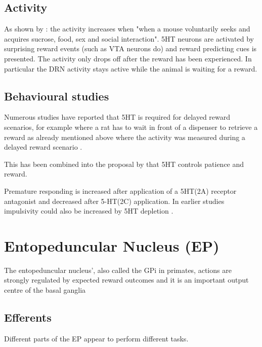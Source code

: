 \documentclass[12pt,a4paper]{article}
\let\oldsection\section
\renewcommand\section{\clearpage\oldsection}
\begin{document}
\subsection{Activity}

As shown by \citep{Li2016}: the activity increases when "when a mouse voluntarily seeks and acquires sucrose, food, sex and social interaction". 5HT neurons are activated by surprising reward events (such as VTA neurons do) and reward predicting cues is presented. The activity only drops off after the reward has been experienced. In particular the DRN activity stays active while the animal is waiting for a reward.

\subsection{Behavioural studies}

Numerous studies have reported that 5HT is required for delayed reward scenarios, for example where a rat has to wait in front of a dispenser to retrieve a reward \citep{Khani2016} as already mentioned above where the activity was measured during a delayed reward scenario \citep{Li2016}.

This has been combined into the proposal by \citep{Miyazaki2012} that 5HT controls patience and reward.

Premature responding is increased after \citep{Fletcher2007} application of a 5HT(2A) receptor antagonist and decreased after 5-HT(2C) application. In earlier studies impulsivity could also be increased by 5HT depletion \citep{Harrison1997}.







\section{Entopeduncular Nucleus (EP)}

The entopeduncular nucleus’, also called the GPi in primates, actions are
strongly regulated by expected reward outcomes and it is an important output centre of the basal ganglia \citep{Rajakumar1993} 

\subsection{Efferents}

Different parts of the EP appear to perform different tasks. 
\end{document}
